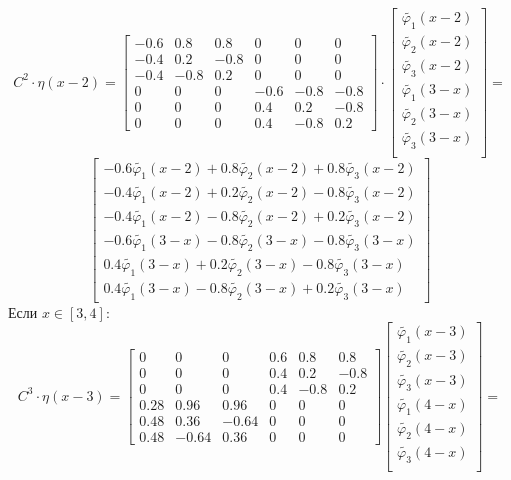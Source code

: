 \documentclass[a4paper, 12pt,fleqn]{extarticle}
\begin{document}
        \[C^2\cdot\eta(x-2)=
        \begin{bmatrix}
            -0.6 & 0.8 & 0.8 & 0 & 0 & 0\\
        -0.4 & 0.2 & -0.8 & 0 & 0 & 0\\
        -0.4 & -0.8 & 0.2 & 0 & 0 & 0\\
        0 & 0 & 0 & -0.6 & -0.8 & -0.8\\
        0 & 0 & 0 & 0.4 & 0.2 & -0.8\\
        0 & 0 & 0 & 0.4 & -0.8 & 0.2
        \end{bmatrix}\cdot 
        \begin{bmatrix}
            \tilde{\varphi_1}(x-2)\\%
            \tilde{\varphi_2}(x-2)\\%
            \tilde{\varphi_3}(x-2)\\%
            \tilde{\varphi_1}(3-x)\\%
            \tilde{\varphi_2}(3-x)\\%
            \tilde{\varphi_3}(3-x)\\%
        \end{bmatrix}=\]
        \[\begin{bmatrix}
            -0.6 \tilde{\varphi_1}(x-2) + 0.8 \tilde{\varphi_2}(x-2) + 0.8 \tilde{\varphi_3}(x-2)\\
            -0.4 \tilde{\varphi_1}(x-2) + 0.2 \tilde{\varphi_2}(x-2) - 0.8 \tilde{\varphi_3}(x-2)\\
            -0.4 \tilde{\varphi_1}(x-2) - 0.8 \tilde{\varphi_2}(x-2) + 0.2 \tilde{\varphi_3}(x-2)\\
            -0.6 \tilde{\varphi_1}(3-x)  - 0.8 \tilde{\varphi_2}(3-x)- 0.8 \tilde{\varphi_3}(3-x)\\
            0.4 \tilde{\varphi_1}(3-x) + 0.2 \tilde{\varphi_2}(3-x) - 0.8 \tilde{\varphi_3}(3-x)\\
            0.4 \tilde{\varphi_1}(3-x)  - 0.8 \tilde{\varphi_2}(3-x)+ 0.2 \tilde{\varphi_3}(3-x)
        \end{bmatrix}
        \]
        Если $x \in [3,4]$:
        \[C^3\cdot\eta(x-3)=
        \begin{bmatrix}
            0 & 0 & 0 & 0.6 & 0.8 & 0.8\\
            0 & 0 & 0 & 0.4 & 0.2 & -0.8\\
            0 & 0 & 0 & 0.4 & -0.8 & 0.2\\
            0.28 & 0.96 & 0.96 & 0 & 0 & 0\\
            0.48 & 0.36 & -0.64 & 0 & 0 & 0\\
            0.48 & -0.64 & 0.36 & 0 & 0 & 0  
        \end{bmatrix}
        \begin{bmatrix}
            \tilde{\varphi_1}(x-3)\\%
            \tilde{\varphi_2}(x-3)\\%
            \tilde{\varphi_3}(x-3)\\%
            \tilde{\varphi_1}(4-x)\\%
            \tilde{\varphi_2}(4-x)\\%
            \tilde{\varphi_3}(4-x)\\%
        \end{bmatrix}=\]
\end{document}

